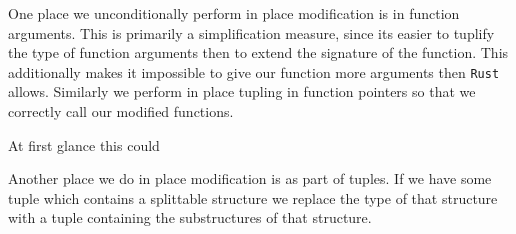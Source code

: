 \documentclass[12pt,oneside]{book}
\newcommand{\rustname}{{\texttt{Rust}}}
\def \rust {\rustname{}\xspace}
\begin{document}
One place we unconditionally perform in place modification is in function
arguments. This is primarily a simplification measure, since its easier to
tuplify the type of function arguments then to extend the signature of the
function. This additionally makes it impossible to give our function more
arguments then \rust allows.
Similarly we perform in place tupling in function pointers so that we correctly
call our modified functions.

At first glance this could

Another place we do in place modification is as part of tuples. If we have some
tuple which contains a splittable structure we replace the type of that
structure with a tuple containing the substructures of that structure.

  

\end{document}
